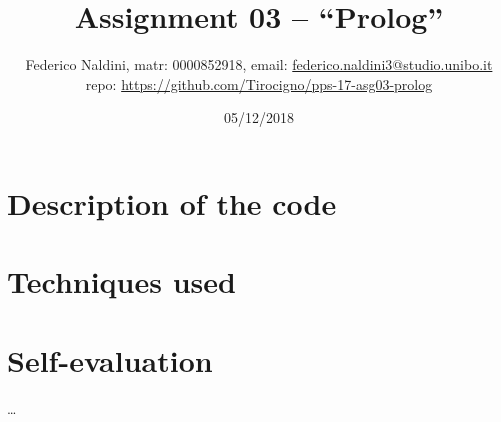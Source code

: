\documentclass[10pt,italian]{article}
\title{\vspace{-70pt}Assignment 03 -- ``Prolog''}
\author{Federico Naldini, matr: 0000852918, email: {\url{federico.naldini3@studio.unibo.it}}\\ repo: {\url{https://github.com/Tirocigno/pps-17-asg03-prolog}}
\date{05/12/2018}}
\begin{document}
\maketitle
\vspace{-30pt}

\section{Description of the code}

\section{Techniques used}


\section{Self-evaluation}

\ldots 
 
\end{document}
